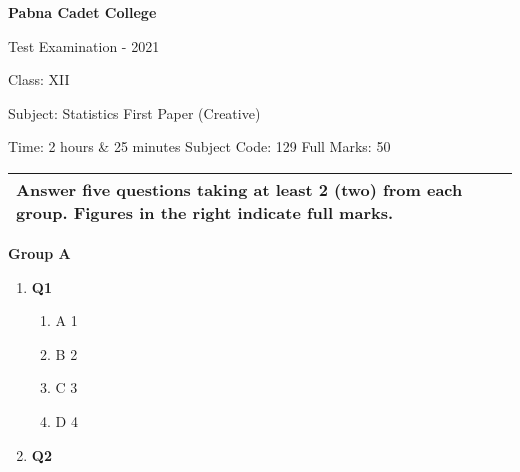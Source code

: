 \documentclass{article}
\begin{document}
\begin{center}
  \bfseries\large
  Pabna Cadet College

\normalsize
  Test Examination - 2021

  Class: XII

  Subject: Statistics First Paper (Creative)

  Time: 2 hours \& 25 minutes \qquad \qquad Subject Code: 129  \qquad  \qquad Full Marks: 50

\end{center}

\noindent
\begin{tabular}{p{\dimexpr\linewidth-2\tabcolsep}}
  Answer five questions taking at least 2 (two) from each group. Figures in the right indicate full marks.\\
  \hline
\end{tabular}

\begin{center}
\textbf{Group A}
\end{center}

\begin{enumerate}
  \item
  \textbf{Q1}
 
  \begin{enumerate}
    \item
	A \hfill 1
    \item
    	B \hfill 2
    \item
    	C \hfill 3
     \item
     	D \hfill 4
  \end{enumerate}

 \item
  \textbf{Q2}
  
\end{enumerate}
\end{document}
